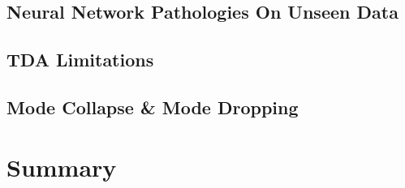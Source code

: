 \subsection{Neural Network Pathologies On Unseen Data}

\subsection{TDA Limitations}

\subsection{Mode Collapse \& Mode Dropping}

\section{Summary}
